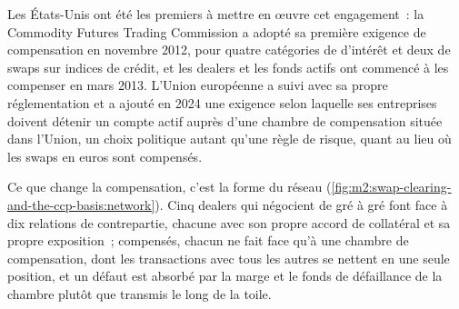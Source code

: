 Les États-Unis ont été les premiers à mettre en œuvre cet engagement~: la Commodity Futures
Trading Commission a adopté sa première exigence de compensation en novembre 2012, pour
quatre catégories de  d'intérêt et deux de swaps sur indices de crédit, et les
dealers et les fonds actifs ont commencé à les compenser en mars 2013. L'Union européenne a suivi
avec sa propre réglementation et a ajouté en 2024 une exigence selon laquelle ses entreprises
doivent détenir un compte actif auprès d'une chambre de compensation située dans l'Union, un choix
politique autant qu'une règle de risque, quant au lieu où les swaps en euros sont compensés.

Ce que change la compensation, c'est la forme du réseau
(\cref{fig:m2:swap-clearing-and-the-ccp-basis:network}). Cinq dealers qui négocient de gré à gré
font face à dix relations de contrepartie, chacune avec son propre accord de collatéral
et sa propre exposition~; compensés, chacun ne fait face qu'à une chambre de compensation, dont
les transactions avec tous les autres se nettent en une seule position, et un défaut est
absorbé par la marge et le fonds de défaillance de la chambre plutôt que transmis le long de la
toile.

\begin{omfigure}
\centering
{}

\label{fig:m2:swap-clearing-and-the-ccp-basis:network}
\end{omfigure}

